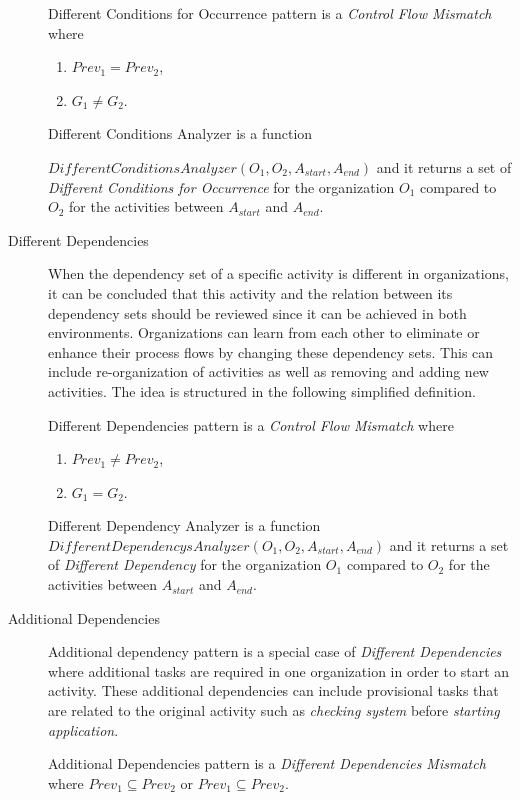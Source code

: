 \begin{description}
		\theoremstyle{definition}
		\begin{definition}
		Different Conditions for Occurrence pattern is a \textit{Control Flow Mismatch} where
		\begin{enumerate}
			\item $Prev_{1} = Prev_{2}$,
			\item $G_{1} \neq G_{2}$.
		\end{enumerate}
		\end{definition}

		\theoremstyle{definition}
		\begin{definition}
		Different Conditions Analyzer is a function 

		$DifferentConditionsAnalyzer(O_{1}, O_{2}, A_{start}, A_{end})$ and it returns a set of \textit{Different Conditions for Occurrence} for the organization $O_{1}$ compared to $O_{2}$ for the activities between $A_{start}$ and $A_{end}$.
		\end{definition}	

	\item[Different Dependencies] When the dependency set of a specific activity is different in organizations, it can be concluded that this activity and the relation between its dependency sets should be reviewed since it can be achieved in both environments. Organizations can learn from each other to eliminate or enhance their process flows by changing these dependency sets. This can include re-organization of activities as well as removing and adding new activities. The idea is structured in the following simplified definition.
		\theoremstyle{definition}
		\begin{definition}
		Different Dependencies pattern is a \textit{Control Flow Mismatch} where
		\begin{enumerate}
			\item $Prev_{1} \neq Prev_{2}$,
			\item $G_{1} = G_{2}$.
		\end{enumerate}
		\end{definition}

		\theoremstyle{definition}
		\begin{definition}
		Different Dependency Analyzer is a function 
		$DifferentDependencysAnalyzer(O_{1}, O_{2}, A_{start}, A_{end})$ and it returns a set of \textit{Different Dependency} for the organization $O_{1}$ compared to $O_{2}$ for the activities between $A_{start}$ and $A_{end}$.
		\end{definition}	
	\item[Additional Dependencies] Additional dependency pattern is a special case of \textit{Different Dependencies} where additional tasks are required in one organization in order to start an activity. These additional dependencies can include provisional tasks that are related to the original activity such as \textit{checking system} before \textit{starting application}. 
		\theoremstyle{definition}
		\begin{definition}
		Additional Dependencies pattern is a \textit{Different Dependencies Mismatch} where $Prev_{1} \subseteq Prev_{2}$ or $Prev_{1} \subseteq Prev_{2}$.
		\end{definition}


\end{description}
